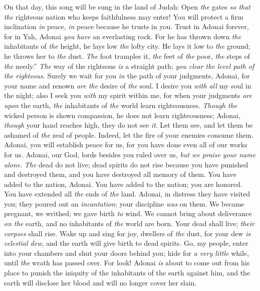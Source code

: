 \begin{biblechapter} %
 On that day, this song will be sung in the land of Judah:
\verse Open \textit{the} gates \textit{so that} \textit{the} righteous nation who keeps faithfulness may enter!
\verse You will protect a firm inclination \textit{in} peace, 
\textit{in} peace because he trusts in you.
\verse Trust in Adonai forever, 
for in Yah, Adonai \textit{you have} an everlasting rock.
\verse For he has thrown down \textit{the} inhabitants of \textit{the} height, 
he lays low \textit{the} lofty city. 
He lays it low to \textit{the} ground; 
he throws her to \textit{the} dust.
\verse \textit{The} foot tramples it, 
\textit{the} feet of \textit{the} poor, \textit{the} steps of \textit{the} needy.”
 \textit{The} way of the righteous \textit{is} a straight path; 
\textit{you clear the level path of the righteous}.
\verse Surely we wait for you \textit{in} the path of your judgments, Adonai, 
for your name and renown \textit{are the} desire of \textit{the} soul.
\verse I desire you \textit{with all} my soul in the night; 
also I seek you \textit{with} my spirit within me, 
for when your judgments \textit{are} \textit{upon} the earth, 
\textit{the} inhabitants of \textit{the} world learn righteousness.
\verse \textit{Though the} wicked person is shown compassion, he does not learn righteousness;
\verse Adonai, \textit{though} your hand reaches high, they do not see \textit{it}.
\verse Let them see, and let them be ashamed of \textit{the} zeal of people. 
Indeed, let the fire of your enemies consume them.
\verse Adonai, you will establish peace for us, 
for you have done even all of our works for us.
\verse Adonai, our God, lords besides you ruled over us, 
\textit{but we praise your name alone}.
\verse \textit{The} dead do not live; 
dead spirits do not rise 
because you have punished and destroyed them, 
and you have destroyed all memory of them.
\verse You have added to the nation, Adonai. 
You have added to the nation; you are honored. 
You have extended all \textit{the} ends of \textit{the} land.
\verse Adonai, in distress they have visited you; 
they poured out an \textit{incantation}; 
your discipline \textit{was} on them.
\verse We became pregnant, we writhed; 
we gave birth \textit{to} wind. 
We cannot bring about deliverance \textit{on the} earth, 
and no inhabitants of \textit{the} world are born.
\verse Your dead shall live; \textit{their corpses} shall rise. 
Wake up and sing for joy, dwellers of \textit{the} dust, 
for your dew \textit{is} \textit{celestial dew}, 
and the earth will give birth to dead spirits.
\verse Go, my people, enter into your chambers 
and shut your doors behind you; 
hide for \textit{a very little} while, 
until \textit{the} wrath has passed over.
\verse For look! Adonai \textit{is} about to come out from his place 
to punish the iniquity of the inhabitants of the earth against him, 
and the earth will disclose her blood 
and will no longer cover her slain.
\end{biblechapter}

